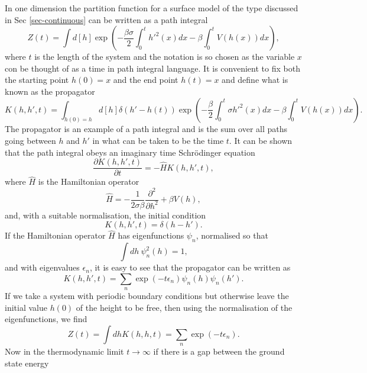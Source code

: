 In one dimension the partition function for a surface model of the type discussed in Sec \ref{sec-continuous} can be written as a path integral 
\begin{equation}
Z(t)  = \int d[h]\exp\left(-\frac{\beta\sigma}{2}\int_0^t h'^2(x) dx -\beta\int_0^t  V(h(x)) dx\right),
\end{equation}
where $t$ is the length of the system and the notation is so chosen as the variable $x$ con be thought of as a time in path integral language.
It is convenient to fix both the starting point $h(0)=x$ and the end point $h(t)=x$ and define what is known as the propagator
\begin{equation}
K(h,h',t)=\int_{h(0)=h} d[h] \delta(h' -h(t)) \exp\left(-\frac{\beta}{2}\int_0^t \sigma h'^2(x) dx -\beta \int_0^t  V(h(x)) dx\right).\label{prog}
\end{equation}
The propagator is an example of a path integral and is the sum over all paths going between 
$h$ and $h'$ in what can be taken to be the time $t$.  It can be shown that the path integral obeys an imaginary time Schr\"odinger equation
\begin{equation}
\frac{\partial  K(h,h',t)}{\partial t} = -\hat H K(h,h',t),
\end{equation}
where $\hat H$ is the Hamiltonian operator
\begin{equation}
\hat H = -\frac{1}{2\sigma\beta}\frac{\partial^2 }{\partial h^2} + \beta V(h),
\end{equation}
and, with a suitable normalisation, the initial condition
\begin{equation}
K(h,h',t)=\delta(h-h').
\end{equation}
If the Hamiltonian operator $\hat H$ has eigenfunctions $\psi_n$, normalised so that
\begin{equation}
\int dh \ \psi^2_n(h) = 1,
\end{equation}
 and with eigenvalues $\epsilon_n$, it is easy to see that the propagator can be written as
\begin{equation}
K(h,h',t)= \sum_n \exp(-t\epsilon_n)\psi_n(h)\psi_n(h').
\end{equation}
If we take a system with periodic boundary conditions but otherwise leave the initial value $h(0)$ of the height to be free, then using the normalisation of the eigenfunctions, we find
\begin{equation}
Z(t) = \int dh K(h,h,t) = \sum_n \exp(-t\epsilon_n).
\end{equation}
Now in the thermodynamic limit $t\to\infty$ if there is a gap between the ground state energy

